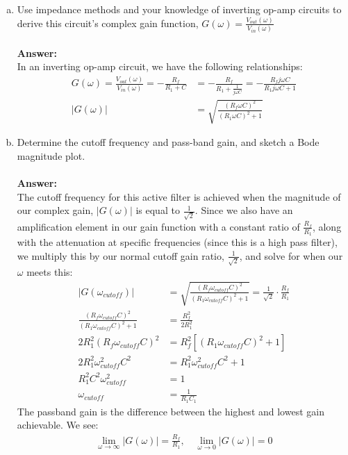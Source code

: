 \documentclass[12pt, a4paper]{article}
\begin{document}
\begin{enumerate}[(a)]
\item Use impedance methods and your knowledge of inverting op-amp circuits to derive this circuit’s complex gain function, $G(\omega) = \frac{V_{out}(\omega)}{V_{in}(\omega)}$ \\ \\
\textbf{Answer: } \\
In an inverting op-amp circuit, we have the following relationships:
\begin{align*}
G(\omega) = \frac{V_{out}(\omega)}{V_{in}(\omega)} = -\frac{R_f}{R_1 +C} &= -\frac{R_f}{R_1 + \frac{1}{j\omega C}} =  -\frac{R_f j \omega C}{R_1 j \omega C + 1} \\
|G (\omega) | &= \sqrt{\frac{(R_f\omega C)^2}{(R_1\omega C)^2 + 1}}
\end{align*}
\item Determine the cutoff frequency and pass-band gain, and sketch a Bode magnitude plot. \\ \\
\textbf{Answer: } \\
The cutoff frequency for this active filter is achieved when the magnitude of our complex gain, $|G(\omega)|$ is equal to $\frac{1}{\sqrt{2}}$. Since we also have an amplification element in our gain function with a constant ratio of $\frac{R_f}{R_1}$, along with the attenuation at specific frequencies (since this is a high pass filter), we multiply this by our normal cutoff gain ratio, $\frac{1}{\sqrt{2}}$, and solve for when our $\omega$ meets this:
\begin{align*}
|G (\omega_{cutoff}) | &= \sqrt{\frac{(R_f\omega_{cutoff} C)^2}{(R_1\omega_{cutoff} C)^2 + 1}} = \frac{1}{\sqrt{2}} \cdot \frac{R_f}{R_1}\\
\frac{(R_f\omega_{cutoff} C)^2}{(R_1\omega_{cutoff} C)^2 + 1} &= \frac{R_f^2}{2R_1^2} \\
2R_1^2(R_f\omega_{cutoff} C)^2 &= R_f^2\left [(R_1\omega_{cutoff} C)^2 + 1 \right ] \\
2R_1^2 \omega_{cutoff}^2C^2  &=R_1^2\omega_{cutoff}^2 C^2 + 1 \\
R_1^2 C^2 \omega_{cutoff}^2 &= 1 \\
\omega_{cutoff} &= \frac{1}{R_1 C_1}
\end{align*}
The passband gain is the difference between the highest and lowest gain achievable. We see:
\begin{align*}
\lim_{\omega \to \infty} |G(\omega)| = \frac{R_f}{R_1}, \quad \lim_{\omega \to 0} |G(\omega)| = 0

\end{align*}
\end{enumerate}
\end{document}

